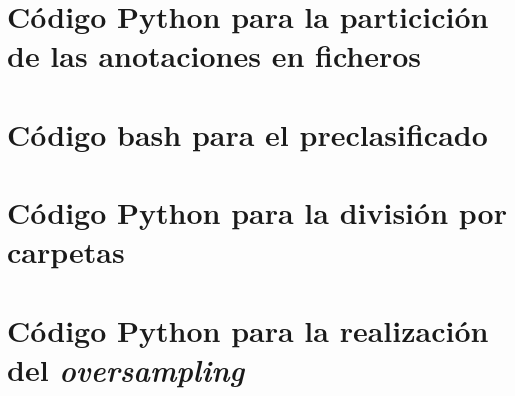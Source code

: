 \documentclass[12pt]{report} %
\begin{document}
    \section*{Código Python para la particición de las anotaciones en ficheros}
    

    \section*{Código bash para el preclasificado}
    \label{preclasificado}
    

    \section*{Código Python para la división por carpetas}
    \label{div_carpetas}
    

    \section*{Código Python para la realización del \textit{oversampling}}
    \label{div_carpetas}
    
\end{document}
